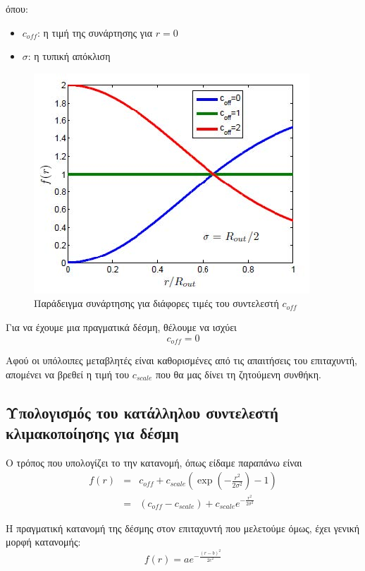 όπου:
\begin{itemize}
\item $c_{off}$: η τιμή της συνάρτησης για $r = 0$
\item $\sigma$: η τυπική απόκλιση
\end{itemize} 

\begin{figure}[tph]
\includegraphics{figures/CST_gauss_function_for_coff}
\centering
\caption{Παράδειγμα  συνάρτησης για διάφορες τιμές του συντελεστή $c_{off}$}
\label{fig:CST_gauss_coff}
\end{figure}

Για να έχουμε μια πραγματικά  δέσμη, θέλουμε να ισχύει
\[c_{off} = 0\]

Αφού οι υπόλοιπες μεταβλητές είναι καθορισμένες από τις απαιτήσεις του επιταχυντή, απομένει να βρεθεί η τιμή του $c_{scale}$ που θα μας δίνει τη ζητούμενη συνθήκη.

\subsection{Υπολογισμός του κατάλληλου συντελεστή κλιμακοποίησης για  δέσμη}

Ο τρόπος που υπολογίζει το  την  κατανομή, όπως είδαμε παραπάνω είναι
\begin{eqnarray}\label{eq:CST_gaussian_model}
f(r) &= & 	c_{off} + c_{scale} \left( \exp \left(-\frac{r^2}{2\sigma^2}\right) - 1 \right) \nonumber \\
&= &\left(c_{off} - c_{scale}\right) + c_{scale} e^{-\frac{r^2}{2\sigma^2}}
\end{eqnarray}

Η πραγματική κατανομή της δέσμης στον επιταχυντή που μελετούμε όμως, έχει γενική μορφή κατανομής:
\begin{equation}\label{eq:General_gaussian_model}
 f(r) = a e^{-\frac{\left(r-b\right)^2}{2c^2}}
\end{equation}

